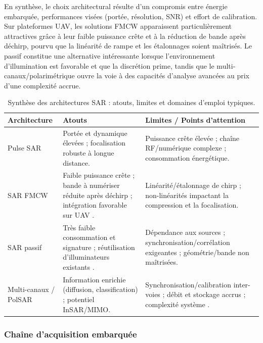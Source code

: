 En synthèse, le choix architectural résulte d’un compromis entre énergie embarquée, performances visées (portée, résolution, SNR) et effort de calibration. Sur plateformes UAV, les solutions FMCW apparaissent particulièrement attractives grâce à leur faible puissance crête et à la réduction de bande après déchirp, pourvu que la linéarité de rampe et les étalonnages soient maîtrisés. Le passif constitue une alternative intéressante lorsque l’environnement d’illumination est favorable et que la discrétion prime, tandis que le multi-canaux/polarimétrique ouvre la voie à des capacités d’analyse avancées au prix d’une complexité accrue.

\begin{table}[htbp]
    \centering
   
    \label{tab:arch_sar_comparatif}
    \renewcommand{\arraystretch}{1.2}
    \begin{tabular}{|p{3.2cm}|p{5.6cm}|p{5.8cm}|}
        \hline
        \textbf{Architecture} & \textbf{Atouts} & \textbf{Limites / Points d’attention} \\
        \hline
        Pulse SAR & Portée et dynamique élevées ; focalisation robuste à longue distance. 
        & Puissance crête élevée ; chaîne RF/numérique complexe ; consommation énergétique. \\
        \hline
        SAR FMCW & Faible puissance crête ; bande à numériser réduite après déchirp ; intégration favorable sur UAV \cite{Aguasca2013_ARBRES_UAV_SAR,Svedin2021_UAVSAR}. 
        & Linéarité/étalonnage de chirp ; non-linéarités impactant la compression et la focalisation. \\
        \hline
        SAR passif & Très faible consommation et signature ; réutilisation d’illuminateurs existants \cite{Sun2020_PassiveUAVSAR}. 
        & Dépendance aux sources ; synchronisation/corrélation exigeantes ; géométrie/bande non maîtrisées. \\
        \hline
        Multi-canaux / PolSAR & Information enrichie (diffusion, classification) ; potentiel InSAR/MIMO. 
        & Synchronisation/calibration inter-voies ; débit et stockage accrus ; complexité système \cite{Krieger2010_InterferometricSAR}. \\
        \hline
    \end{tabular}
     \caption{Synthèse des architectures SAR : atouts, limites et domaines d’emploi typiques.}
\end{table}
\FloatBarrier

\subsubsection{Chaîne d’acquisition embarquée}

